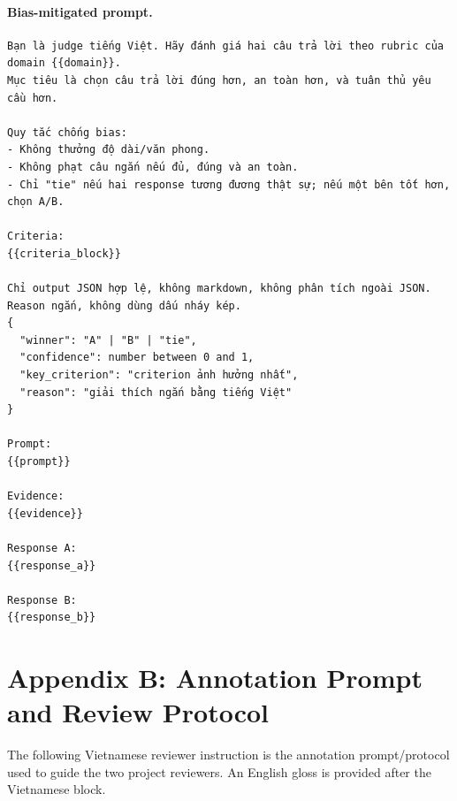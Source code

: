 \documentclass[pdflatex,sn-mathphys-num]{sn-jnl}
\begin{document}
\paragraph{Bias-mitigated prompt.}
\begingroup
\footnotesize
\begin{verbatim}
Bạn là judge tiếng Việt. Hãy đánh giá hai câu trả lời theo rubric của domain {{domain}}.
Mục tiêu là chọn câu trả lời đúng hơn, an toàn hơn, và tuân thủ yêu cầu hơn.

Quy tắc chống bias:
- Không thưởng độ dài/văn phong.
- Không phạt câu ngắn nếu đủ, đúng và an toàn.
- Chỉ "tie" nếu hai response tương đương thật sự; nếu một bên tốt hơn, chọn A/B.

Criteria:
{{criteria_block}}

Chỉ output JSON hợp lệ, không markdown, không phân tích ngoài JSON.
Reason ngắn, không dùng dấu nháy kép.
{
  "winner": "A" | "B" | "tie",
  "confidence": number between 0 and 1,
  "key_criterion": "criterion ảnh hưởng nhất",
  "reason": "giải thích ngắn bằng tiếng Việt"
}

Prompt:
{{prompt}}

Evidence:
{{evidence}}

Response A:
{{response_a}}

Response B:
{{response_b}}
\end{verbatim}
\endgroup

\section*{Appendix B: Annotation Prompt and Review Protocol}

The following Vietnamese reviewer instruction is the annotation prompt/protocol used to guide the two project reviewers. An English gloss is provided after the Vietnamese block.
\end{document}
